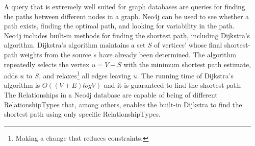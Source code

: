 A query that is extremely well suited for graph databases are queries for finding the paths between different nodes in a graph. Neo4j can be used to see whether a path exists, finding the optimal path, and looking for variability in the path\citep[p. 51]{bruggen14}. Neo4j includes built-in methods for finding the shortest path, including Dijkstra's algorithm. Dijkstra's algorithm \cite[p.658-662]{cormen09} maintains a set $S$ of vertices' whose final shortest-path weights from the source $s$ have already been determined. The algorithm repeatedly selects the vertex $u = V - S$ with the minimum shortest path estimate, adds $u$ to $S$, and relaxes\footnote{Making a change that reduces constraints.} all edges leaving $u$. The running time of Dijkstra's algorithm is $O((V + E)log V)$ and it is guaranteed to find the shortest path\cite[p.~661]{cormen09}. %
The Relationships in a Neo4j database are capable of being of different RelationshipTypes that, among others, enables the built-in Dijkstra to find the shortest path using only specific RelationshipTypes.





